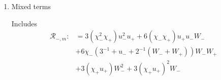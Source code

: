 \documentclass[letterpaper,11pt]{article}
\newcommand{\rmO}{\mathcal{O}}
\newcommand{\eps}{\varepsilon}
\newcommand{\lar}{ \lesssim }
\numberwithin{equation}{section}
\theoremstyle{plain}
\begin{document}
\begin{enumerate}
\begin{itemize}
\begin{enumerate}
\begin{proof}
For $t < \eps^{-1}\delta$, set again $\beta = 1-\eps \delta^{-1}t$, then
\begin{align*}
|I(t)\chi_-  W_-^2|_\infty &\lar \frac{ \left( \delta^{-\frac{1}{4}}(\delta-\eps t)+\delta^{\frac{1}{4}}\eps^{\frac{1}{3}} \right)^2}{\delta^{-\frac{1}{4}}(\delta-\eps t)^{\frac{3}{2}}+\delta^{\frac{1}{4}}\eps^{\frac{2}{3}} } = \delta^{-\frac{1}{4}}\frac{\left( \delta^{\frac{3}{4}}\beta+\delta^{\frac{1}{4}}\eps^{\frac{1}{3}} \right)^2 }{\delta\beta^{\frac{3}{2}}+\eps^{\frac{2}{3}}} \\
& \lar \delta^{-\frac{1}{4}} \left(\frac{\delta^{\frac{3}{2}}\beta^2}{\delta\beta^{\frac{3}{2}}} + \frac{\delta^{\frac{1}{2}}\eps^{\frac{2}{3}}}{\eps^{\frac{2}{3}}} \right) \lar \delta^{\frac{1}{4}}
\end{align*}


================================================

For the cubic term, we use $(\chi_-u_- + W_-)^3 \le C[(\chi_-u_-)^3+W_-^3]$ for some constant $C$ to estimate each term separately.
First we estimate (for $t>\eps^{-1}\delta$)
\[
\|\chi_-u_-^3 \|_{\mathcal{C}_V} \le |\eps^{\frac{1-\nu}{3}}(T_\infty - t)^{1+\nu} \eps u_R^3 |_{\infty} \le \eps^{-\frac{1-v}{3}} \eps^{-\frac{1+v}{6}} \eps^{\frac{1}{2}} = \eps^{\frac{\nu}{6}}
\]

On the interval $t<\eps^{-1}\delta$, we have
\[
\| \chi_-u_-^3\|_{\mathcal{C}_V} = \rmO(1)
\]
using the asymptotics $u_R(s) \to -(-s)^{\frac{1}{2}}$ as $s \to \infty$. At $t = 0$ the leading order terms of $V(t)$ gives $\delta^{\frac{3}{2}}$. While $u_-(t)$ gives
\[
u_-^3 = \eps u_R^3(s) = \eps s^{\frac{3}{2}} = \eps [\eps^{\frac{1}{3}}(\delta\eps^{-1}-t)]^{\frac{3}{2}} = \delta^{\frac{3}{2}}
\]
at $t=0$.

Finally for the cubic term, we have
\[
\|W_-^3\|_{\mathcal{C}_V} \le \|W_-\|_{\mathcal{C}_v}  |(T_\infty - t)W_-^2 |_\infty = \rmO(\eps^{\frac{3-2\nu}{6}})\|W_-\|_{\mathcal{C}_v}
\]
for $t$ near $t_*$.

And ($\tau = \eps^{-1}\delta - t$, again),
\[
\|W_-^3\|_{\mathcal{C}_V}  \le \left| [\eps \tau +\eps^{2/3}]^{-1} [\eps\tau+\eps^{\frac{1}{3}}]^3\right|_{\infty} = \rmO(\eps^2)
\]
\end{proof}

\item Mixed terms

Includes
\begin{align*}
\mathcal{R}_{-,m} :&= 3(\chi_-^2\chi_+) u_-^2 u_+  + 6(\chi_-\chi_+) u_+ u_-W_- \\ 
&+ 6\chi_-(3^{-1}+u_- +2^{-1}(W_-+W_+))W_-W_+
\\ 
&+3(\chi_+u_+)W_-^2 +3(\chi_+u_+)^2W_-  
\end{align*}


\end{enumerate}
\end{itemize}
\end{enumerate}
\end{document}

